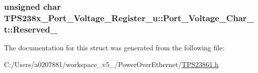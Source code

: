 \hypertarget{struct_t_p_s238x___port___voltage___register__u_1_1_port___voltage___char__t_a50336d796fe9ce2e788f93f105b0577a}{
\subsubsection[{Reserved\-\_\-17}]{\setlength{\rightskip}{0pt plus 5cm}unsigned char T\-P\-S238x\-\_\-\-Port\-\_\-\-Voltage\-\_\-\-Register\-\_\-u\-::\-Port\-\_\-\-Voltage\-\_\-\-Char\-\_\-t\-::\-Reserved\-\_}}\label{struct_t_p_s238x___port___voltage___register__u_1_1_port___voltage___char__t_a50336d796fe9ce2e788f93f105b0577a}


The documentation for this struct was generated from the following file\-:\begin{DoxyCompactItemize}
\item 
C\-:/\-Users/a0207881/workspace\-\_\-v5\-\_/\-Power\-Over\-Ethernet/\hyperlink{_t_p_s23861_8h}{T\-P\-S23861.\-h}\end{DoxyCompactItemize}
